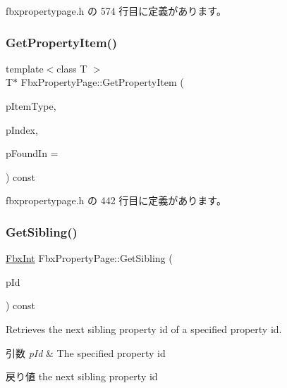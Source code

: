  fbxpropertypage.\+h の 574 行目に定義があります。

\mbox{\label{class_fbx_property_page_a8a4190bff3b6acdc5adda7350cd0367d}} 
\subsubsection{\texorpdfstring{Get\+Property\+Item()}{GetPropertyItem()}}
{\footnotesize\ttfamily template$<$class T $>$ \\
T$\ast$ Fbx\+Property\+Page\+::\+Get\+Property\+Item (\begin{DoxyParamCaption}\item[{const T $\ast$}]{p\+Item\+Type,  }\item[{\hyperlink{fbxtypes_8h_a088fa96de3b0b3ea69f0f6afef525dfb}{Fbx\+Int}}]{p\+Index,  }\item[{\hyperlink{class_fbx_property_page}{Fbx\+Property\+Page} $\ast$$\ast$}]{p\+Found\+In = {} }\end{DoxyParamCaption}) const\hspace{0.3cm}{\ttfamily [inline]}}



 fbxpropertypage.\+h の 442 行目に定義があります。

\mbox{\label{class_fbx_property_page_afdfaca9fe375ee1254478340f707f7c5}} 
\subsubsection{\texorpdfstring{Get\+Sibling()}{GetSibling()}}
{\footnotesize\ttfamily \hyperlink{fbxtypes_8h_a088fa96de3b0b3ea69f0f6afef525dfb}{Fbx\+Int} Fbx\+Property\+Page\+::\+Get\+Sibling (\begin{DoxyParamCaption}\item[{\hyperlink{fbxtypes_8h_a088fa96de3b0b3ea69f0f6afef525dfb}{Fbx\+Int}}]{p\+Id }\end{DoxyParamCaption}) const\hspace{0.3cm}{\ttfamily [inline]}}

Retrieves the next sibling property id of a specified property id. 
\begin{DoxyParams}{引数}
{\em p\+Id} & The specified property id \\
\hline
\end{DoxyParams}
\begin{DoxyReturn}{戻り値}
the next sibling property id 
\end{DoxyReturn}


